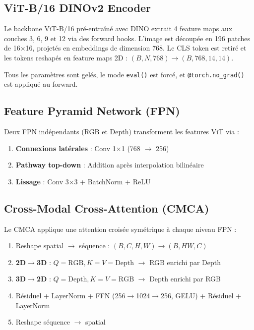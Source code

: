\documentclass[12pt,a4paper,oneside]{report}
\begin{document}
\subsection{ViT-B/16 DINOv2 Encoder}

Le backbone ViT-B/16 pré-entraîné avec DINO extrait 4 feature maps aux couches 3, 6, 9 et 12 via des forward hooks. L'image est découpée en 196 patches de 16$\times$16, projetés en embeddings de dimension 768. Le CLS token est retiré et les tokens reshapés en feature maps 2D : $(B, N, 768) \rightarrow (B, 768, 14, 14)$.

Tous les paramètres sont gelés, le mode \texttt{eval()} est forcé, et \texttt{@torch.no\_grad()} est appliqué au forward.

\subsection{Feature Pyramid Network (FPN)}

Deux FPN indépendants (RGB et Depth) transforment les features ViT via :
\begin{enumerate}
    \item \textbf{Connexions latérales} : Conv 1$\times$1 (768 $\to$ 256)
    \item \textbf{Pathway top-down} : Addition après interpolation bilinéaire
    \item \textbf{Lissage} : Conv 3$\times$3 + BatchNorm + ReLU
\end{enumerate}

\subsection{Cross-Modal Cross-Attention (CMCA)}

Le CMCA applique une attention croisée symétrique à chaque niveau FPN :
\begin{enumerate}
    \item Reshape spatial $\to$ séquence : $(B, C, H, W) \to (B, HW, C)$
    \item \textbf{2D$\to$3D} : $Q=\text{RGB}, K=V=\text{Depth}$ $\to$ RGB enrichi par Depth
    \item \textbf{3D$\to$2D} : $Q=\text{Depth}, K=V=\text{RGB}$ $\to$ Depth enrichi par RGB
    \item Résiduel + LayerNorm + FFN (256$\to$1024$\to$256, GELU) + Résiduel + LayerNorm
    \item Reshape séquence $\to$ spatial
\end{enumerate}
\end{document}
